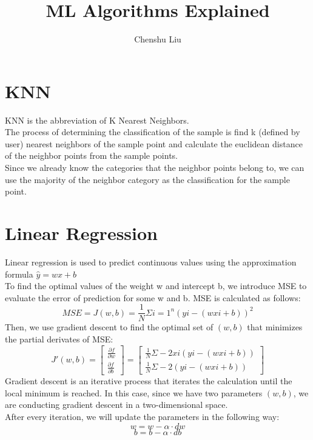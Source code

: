 \documentclass[12pt]{article}
\title{ML Algorithms Explained}
\author{Chenshu Liu}
\begin{document}
\maketitle

\section{KNN}
 KNN is the abbreviation of K Nearest Neighbors. \\
The process of determining the classification of the sample is find k (defined by user) nearest neighbors of the sample point and calculate the euclidean distance of the neighbor points from the sample points. \\
Since we already know the categories that the neighbor points belong to, we can use the majority of the neighbor category as the classification for the sample point.

\section{Linear Regression}
Linear regression is used to predict continuous values using the approximation formula $\hat{y} = wx + b$\\
To find the optimal values of the weight w and intercept b, we introduce MSE to evaluate the error of prediction for some w and b. MSE is calculated as follows:
$$MSE = J(w, b) = \frac{1}{N}\Sigma  {i=1}^n(y  i - (wx  i + b))^2$$
Then, we use   gradient descent   to find the optimal set of $(w, b)$ that minimizes the partial derivates of MSE:
$$J'(w, b) = \begin{bmatrix} \frac{\partial f}{\partial w} \\ \frac{\partial f}{\partial b} \end{bmatrix} = \begin{bmatrix} \frac{1}{N}\Sigma -2x  i(y  i - (wx  i + b))\\ \frac{1}{N}\Sigma -2(y  i - (wx  i + b))\end{bmatrix}
$$
Gradient descent is an iterative process that iterates the calculation until the local minimum is reached. In this case, since we have two parameters $(w, b)$, we are conducting gradient descent in a two-dimensional space.\\
After every iteration, we will update the parameters in the following way:
$$w = w - \alpha \cdot dw$$
$$b = b - \alpha \cdot db$$
\end{document}
